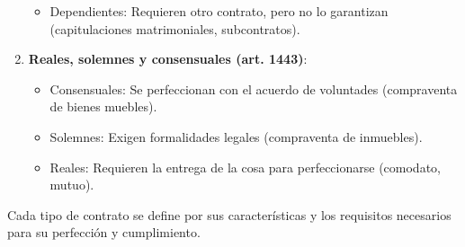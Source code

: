 \documentclass{templateNote}
\begin{document}
\begin{enumerate}
\begin{itemize}
        \item Dependientes: Requieren otro contrato, pero no lo garantizan (capitulaciones matrimoniales, subcontratos).
    \end{itemize}
    \item \textbf{Reales, solemnes y consensuales (art. 1443)}:
    \begin{itemize}
        \item Consensuales: Se perfeccionan con el acuerdo de voluntades (compraventa de bienes muebles).
        \item Solemnes: Exigen formalidades legales (compraventa de inmuebles).
        \item Reales: Requieren la entrega de la cosa para perfeccionarse (comodato, mutuo).
    \end{itemize}
\end{enumerate}

Cada tipo de contrato se define por sus características y los requisitos necesarios para su perfección y cumplimiento.
\end{document}
